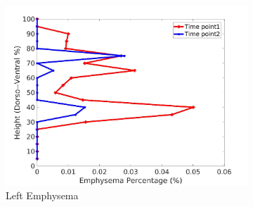 \begin{figure}[H]
\begin{subfigure}{.42\linewidth}
  \includegraphics[width=\linewidth,trim={{.0\wd0} {.0\wd0} {.0\wd0} {.0\wd0}},clip]{Appendix/Image_AppexA/DorsoToVentral/IPF10LeftLungEmphysemaDiseaseDorsoToVentral.jpg} %
  \caption{Left Emphysema}
  \label{fig:IPF10DiseaseDorsoToVentral-g} 
\end{subfigure} 
\begin{subfigure}{.42\linewidth}%

\end{subfigure}
\end{figure}

